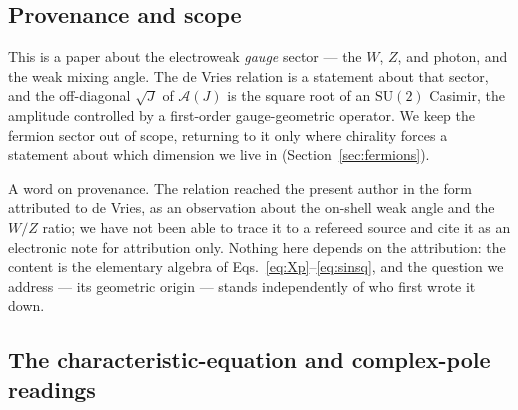 \documentclass[11pt]{article}
\theoremstyle{plain}
\theoremstyle{definition}
\newcommand{\cA}{\mathcal{A}}
\newcommand{\SU}{\mathrm{SU}}
\begin{document}
\subsection{Provenance and scope}
\label{sec:genre}

This is a paper about the electroweak \emph{gauge} sector --- the $W$, $Z$,
and photon, and the weak mixing angle. The de Vries relation is a statement
about that sector, and the off-diagonal $\sqrt J$ of $\cA(J)$ is the square
root of an $\SU(2)$ Casimir, the amplitude controlled by a first-order
gauge-geometric operator. We keep the fermion sector out of scope, returning
to it only where chirality forces a statement about which dimension we live
in (Section~\ref{sec:fermions}).

A word on provenance. The relation reached the present author in the form
attributed to de Vries, as an observation about the on-shell weak angle and
the $W/Z$ ratio; we have not been able to trace it to a refereed source and
cite it as an electronic note for attribution only. Nothing here depends on
the attribution: the content is the elementary algebra of
Eqs.~\eqref{eq:Xp}--\eqref{eq:sinsq}, and the question we address --- its
geometric origin --- stands independently of who first wrote it down.

\subsection{The characteristic-equation and complex-pole readings}
\label{sec:pole}
\end{document}
